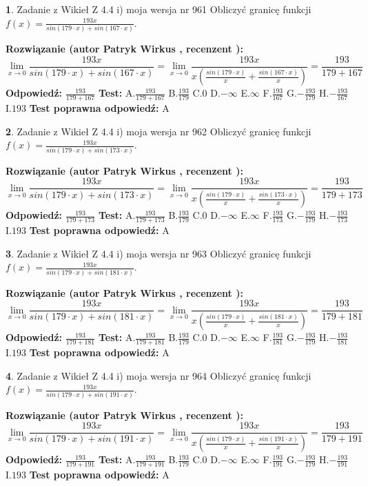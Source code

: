 \documentclass[12pt, a4paper]{article}
\theoremstyle{definition} %
\newtheorem{zad}{}
\newcommand{\zadStart}[1]{\begin{zad}#1\newline}
\newcommand{\zadStop}{\end{zad}}
\newcommand{\rozwStart}[2]{\noindent \textbf{Rozwiązanie (autor #1 , recenzent #2): }\newline}
\newcommand{\rozwStop}{\newline}
\newcommand{\odpStart}{\noindent \textbf{Odpowiedź:}\newline}
\newcommand{\odpStop}{\newline}
\newcommand{\testStart}{\noindent \textbf{Test:}\newline}
\newcommand{\testStop}{\newline}
\newcommand{\kluczStart}{\noindent \textbf{Test poprawna odpowiedź:}\newline}
\newcommand{\kluczStop}{\newline}
\begin{document}
\zadStart{Zadanie z Wikieł Z 4.4 i) moja wersja nr 961}
Obliczyć granicę funkcji $f(x)=\frac{193x}{sin(179\cdot x) +sin(167\cdot x)}$.
\zadStop
\rozwStart{Patryk Wirkus}{}
$$\lim\limits_{x\to 0}\frac{193x}{sin(179\cdot x) +sin(167\cdot x)}=\lim\limits_{x\to 0}\frac{193x}{x(\frac{sin(179\cdot x)}{x}+\frac{sin(167\cdot x)}{x})}=\frac{193}{179+167}$$
\rozwStop
\odpStart
$\frac{193}{179+167}$
\odpStop
\testStart
A.$\frac{193}{179+167}$
B.$\frac{193}{179}$
C.$0$
D.$-\infty$
E.$\infty$
F.$\frac{193}{167}$
G.$-\frac{193}{179}$
H.$-\frac{193}{167}$
I.$193$
\testStop
\kluczStart
A
\kluczStop



\zadStart{Zadanie z Wikieł Z 4.4 i) moja wersja nr 962}
Obliczyć granicę funkcji $f(x)=\frac{193x}{sin(179\cdot x) +sin(173\cdot x)}$.
\zadStop
\rozwStart{Patryk Wirkus}{}
$$\lim\limits_{x\to 0}\frac{193x}{sin(179\cdot x) +sin(173\cdot x)}=\lim\limits_{x\to 0}\frac{193x}{x(\frac{sin(179\cdot x)}{x}+\frac{sin(173\cdot x)}{x})}=\frac{193}{179+173}$$
\rozwStop
\odpStart
$\frac{193}{179+173}$
\odpStop
\testStart
A.$\frac{193}{179+173}$
B.$\frac{193}{179}$
C.$0$
D.$-\infty$
E.$\infty$
F.$\frac{193}{173}$
G.$-\frac{193}{179}$
H.$-\frac{193}{173}$
I.$193$
\testStop
\kluczStart
A
\kluczStop



\zadStart{Zadanie z Wikieł Z 4.4 i) moja wersja nr 963}
Obliczyć granicę funkcji $f(x)=\frac{193x}{sin(179\cdot x) +sin(181\cdot x)}$.
\zadStop
\rozwStart{Patryk Wirkus}{}
$$\lim\limits_{x\to 0}\frac{193x}{sin(179\cdot x) +sin(181\cdot x)}=\lim\limits_{x\to 0}\frac{193x}{x(\frac{sin(179\cdot x)}{x}+\frac{sin(181\cdot x)}{x})}=\frac{193}{179+181}$$
\rozwStop
\odpStart
$\frac{193}{179+181}$
\odpStop
\testStart
A.$\frac{193}{179+181}$
B.$\frac{193}{179}$
C.$0$
D.$-\infty$
E.$\infty$
F.$\frac{193}{181}$
G.$-\frac{193}{179}$
H.$-\frac{193}{181}$
I.$193$
\testStop
\kluczStart
A
\kluczStop



\zadStart{Zadanie z Wikieł Z 4.4 i) moja wersja nr 964}
Obliczyć granicę funkcji $f(x)=\frac{193x}{sin(179\cdot x) +sin(191\cdot x)}$.
\zadStop
\rozwStart{Patryk Wirkus}{}
$$\lim\limits_{x\to 0}\frac{193x}{sin(179\cdot x) +sin(191\cdot x)}=\lim\limits_{x\to 0}\frac{193x}{x(\frac{sin(179\cdot x)}{x}+\frac{sin(191\cdot x)}{x})}=\frac{193}{179+191}$$
\rozwStop
\odpStart
$\frac{193}{179+191}$
\odpStop
\testStart
A.$\frac{193}{179+191}$
B.$\frac{193}{179}$
C.$0$
D.$-\infty$
E.$\infty$
F.$\frac{193}{191}$
G.$-\frac{193}{179}$
H.$-\frac{193}{191}$
I.$193$
\testStop
\kluczStart
A
\kluczStop
\end{document}
